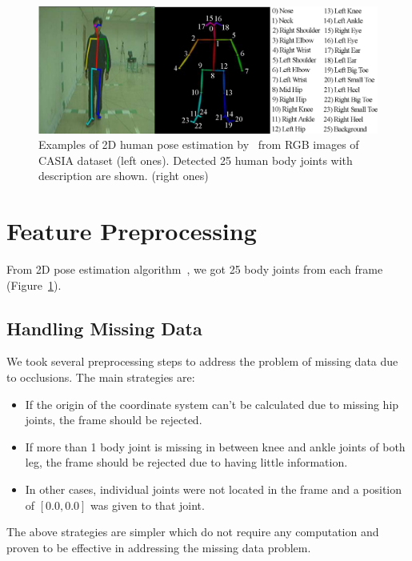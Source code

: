 \begin{figure}
	\centering 
	\includegraphics[width = \textwidth]{figures/pose_estimation.eps}
	\caption[Examples of 2D human pose estimation from RGB images of CASIA dataset]
	{Examples of 2D human pose estimation by~\cite{Cao_19} from RGB images of CASIA dataset (left ones). Detected 25 human body joints with description are shown. (right ones) \label{fig:pose_estimation}
	}
\end{figure}

\section{Feature Preprocessing}
From 2D pose estimation algorithm~\cite{Cao_19}, we got 25 body joints from each frame (Figure~\ref{fig:pose_estimation}). 

\subsection{Handling Missing Data}
We took several preprocessing steps to address the problem of missing data due to occlusions. The main strategies are: 
\begin{itemize}
\item If the origin of the coordinate system can't be calculated due to missing hip joints, the frame should be rejected.
\item If more than 1 body joint is missing in between knee and ankle joints of both leg, the frame should be rejected due to having little information.
\item In other cases, individual joints were not located in the frame and a position of $[0.0, 0.0]$  was given to that joint. 
\end{itemize}

The above strategies are simpler which do not require any computation and proven to be effective in addressing the missing data problem.

